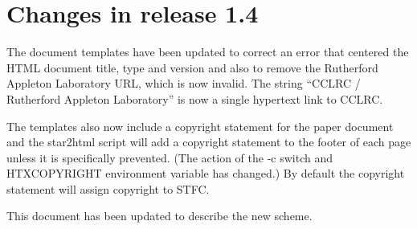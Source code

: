 \documentclass[twoside,11pt]{article}
\newcommand{\xlabel}[1]{}
\renewcommand{\_}{\texttt{\symbol{95}}}
\begin{document}
\newpage
\appendix
\section{\xlabel{changes_in_this_release}\label{changes}Changes in release 1.4}
The document templates have been updated to correct an error that centered
the HTML document title, type and version and also to remove the Rutherford
Appleton Laboratory URL, which is now invalid. The string ``CCLRC /
Rutherford Appleton Laboratory'' is now a single hypertext link to CCLRC.

The templates also now include a copyright statement for the paper document
and the star2html script will add a copyright statement to the footer of each
page unless it is specifically prevented. (The action of the -c switch and 
HTX\_COPYRIGHT environment variable has changed.) By default the copyright 
statement will assign copyright to STFC.

This document has been updated to describe the new scheme.
\end{document}
